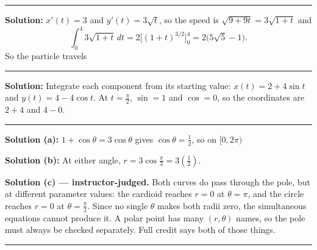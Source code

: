\documentclass[12pt]{article}
\begin{document}
\vspace{0.2cm}\noindent\rule{\linewidth}{0.2pt}\vspace{0.2cm}


\textbf{Solution:} $x'(t) = 3$ and $y'(t) = 3\sqrt{t}$, so the speed is $\sqrt{9 + 9t} = 3\sqrt{1+t}$ and
\[ \int_0^4 3\sqrt{1+t}\,dt = 2\Big[(1+t)^{3/2}\Big]_0^4 = 2\big(5\sqrt{5} - 1\big). \]
So the particle travels 

\vspace{0.2cm}\noindent\rule{\linewidth}{0.2pt}\vspace{0.2cm}


\textbf{Solution:} Integrate each component from its starting value: $x(t) = 2 + 4\sin t$ and $y(t) = 4 - 4\cos t$. At $t = \frac{\pi}{2}$, $\sin = 1$ and $\cos = 0$, so the coordinates are $2 + 4$ and $4 - 0$. 

\vspace{0.2cm}\noindent\rule{\linewidth}{0.2pt}\vspace{0.2cm}


\textbf{Solution (a):} $1 + \cos\theta = 3\cos\theta$ gives $\cos\theta = \tfrac{1}{2}$, so on $[0, 2\pi)$ 

\textbf{Solution (b):} At either angle, $r = 3\cos\frac{\pi}{3} = 3\left(\tfrac{1}{2}\right)$. 

\textbf{Solution (c) --- instructor-judged.} Both curves do pass through the pole, but at different parameter values: the cardioid reaches $r = 0$ at $\theta = \pi$, and the circle reaches $r = 0$ at $\theta = \frac{\pi}{2}$. Since no single $\theta$ makes both radii zero, the simultaneous equations cannot produce it. A polar point has many $(r, \theta)$ names, so the pole must always be checked separately. Full credit says both of those things.

\vspace{0.2cm}\noindent\rule{\linewidth}{0.2pt}\vspace{0.2cm}
\end{document}
